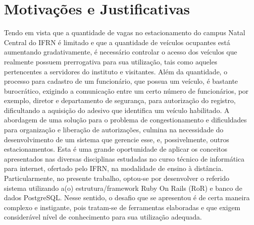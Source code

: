 \section{Motivações e Justificativas}
Tendo em vista que a quantidade de vagas no estacionamento do campus Natal Central do IFRN é limitado e que a quantidade de veículos ocupantes está aumentando gradativamente, é necessário controlar o acesso dos veículos que realmente possuem prerrogativa para sua utilização, tais como aqueles pertencentes a servidores do instituto e visitantes. Além da quantidade, o processo para cadastro de um funcionário, que possua um veículo, é bastante burocrático, exigindo a comunicação entre um certo número de funcionários, por exemplo, diretor e  departamento de segurança, para autorização do registro, dificultando a aquisição do adesivo que identifica um veículo habilitado. A abordagem de uma solução para o problema de congestionamento e dificuldades para organização e liberação de autorizações, culmina na necessidade do desenvolvimento de um sistema que gerencie esse, e, possivelmente, outros estacionamentos. Esta é uma grande oportunidade de aplicar os conceitos apresentados nas diversas disciplinas estudadas no curso técnico de informática para internet, ofertado pelo IFRN, na modalidade de ensino à distância. Particularmente, no presente trabalho, optou-se por desenvolver o referido sistema utilizando a(o) estrutura/framework Ruby On Rails (RoR) e banco de dados PostgreSQL. Nesse sentido, o desafio que se apresentou é de certa maneira complexo e instigante, pois tratam-se de ferramentas elaboradas e que exigem considerável nível de conhecimento para sua utilização adequada. 

